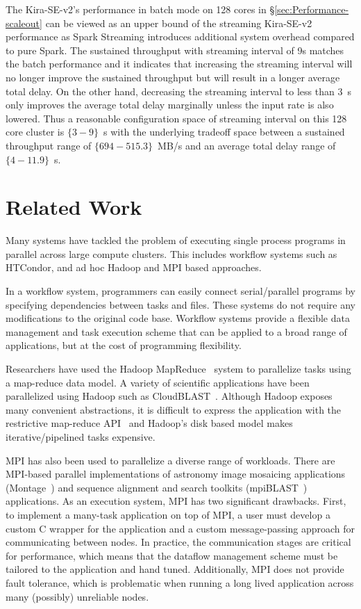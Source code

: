 \documentclass[10pt,journal,compsoc]{IEEEtran}
\begin{document}
The Kira-SE-v2's performance in batch mode on 128 cores in \S\ref{sec:Performance-scaleout} 
can be viewed as an upper bound of the streaming Kira-SE-v2 performance as Spark Streaming
introduces additional system overhead compared to pure Spark.
The sustained throughput with streaming interval of 9s matches the batch performance and
it indicates that increasing the streaming interval will no longer improve the sustained throughput 
but will result in a longer average total delay.
On the other hand, decreasing the streaming interval to less than 3~s only improves the average total delay
marginally unless the input rate is also lowered.
Thus a reasonable configuration space of streaming interval on this 128 core cluster is $\{3-9\}$~s with the underlying tradeoff
space between a sustained throughput range of $\{694-515.3\}$~MB/s and 
an average total delay range of $\{4-11.9\}$~s.

\section{Related Work}
\label{sec:Related}

Many systems have tackled the problem of executing single process programs in parallel
across large compute clusters. This includes workflow systems such as HTCondor,
and ad hoc Hadoop and MPI based approaches.

In a workflow system, programmers can easily connect serial/parallel programs by specifying
dependencies between tasks and files. These systems do not require any modifications to
the original code base. Workflow systems provide a flexible data management and task execution
scheme that can be applied to a broad range of applications, but at the cost of programming
flexibility.

Researchers have used the Hadoop MapReduce~\cite{HADOOP} system to parallelize
tasks using a map-reduce data model. A variety of scientific applications have been parallelized
using Hadoop such as CloudBLAST~\cite{matsunaga08}. 
Although Hadoop exposes many convenient abstractions, it is difficult to express the application 
with the restrictive map-reduce API~\cite{dewitt08} and Hadoop's disk based model makes 
iterative/pipelined tasks expensive.

MPI has also been used to parallelize a diverse range of workloads. There
are MPI-based parallel implementations of astronomy image
mosaicing applications (Montage~\cite{jacob09}) and
sequence alignment and search toolkits (mpiBLAST~\cite{lin08}) applications. As an
execution system, MPI has two significant drawbacks. First, to implement a many-task
application on top of MPI, a user must develop a custom C wrapper for the application
and a custom message-passing approach for communicating between nodes. In practice, the
communication stages are critical for performance, which means that the
dataflow management scheme must be tailored to the application and hand tuned. Additionally,
MPI does not provide fault tolerance, which is problematic when running a long lived
application across many (possibly) unreliable nodes.
\end{document}
